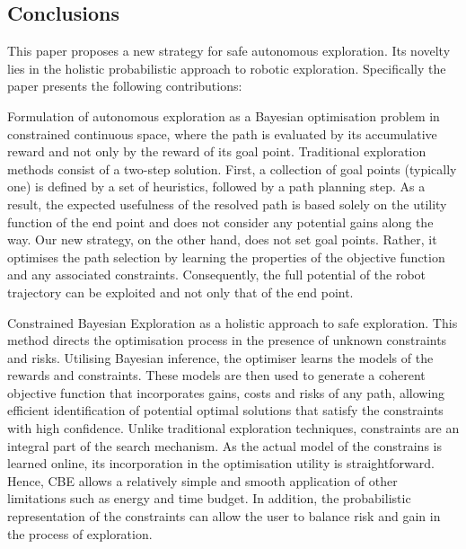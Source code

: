 \documentclass[shortAfour,sageh,times]{sagej_no_sage}
\begin{document}
\subsection{Conclusions}
\label{subsec:conclusion}
This paper proposes a new strategy for safe autonomous exploration. Its novelty lies in the holistic probabilistic approach to robotic exploration. Specifically the paper presents the following contributions:
\begin{inparaenum}[(i)]  
 	
 	\item Formulation of autonomous exploration as a Bayesian optimisation problem in constrained continuous space, where the path is evaluated by its accumulative reward and not only by the reward of its goal point. Traditional exploration methods consist of a two-step solution. First, a collection of goal points (typically one) is defined by a set of heuristics, followed by a path planning step. As a result, the expected usefulness of the resolved path is based solely on the utility function of the end point and does not consider any potential gains along the way. Our new strategy, on the other hand, does not set goal points. Rather, it optimises the path selection by learning the properties of the objective function and any associated constraints. Consequently, the full potential of the robot trajectory can be exploited and not only that of the end point. 
 	
 	\item Constrained Bayesian Exploration as a holistic approach to safe exploration. This method directs the optimisation process in the presence of unknown constraints and risks. Utilising Bayesian inference, the optimiser learns the models of the rewards and constraints. These models are then used to generate a coherent objective function that incorporates gains, costs and risks of any path, allowing efficient identification of potential optimal solutions that satisfy the constraints with high confidence. Unlike traditional exploration techniques, constraints are an integral part of the search mechanism. As the actual model of the constrains is learned online, its incorporation in the optimisation utility is straightforward. Hence, CBE allows a relatively simple and smooth application of other limitations such as energy and time budget. In addition, the probabilistic representation of the constraints can allow the user to balance risk and gain in the process of exploration. 
 \end{inparaenum}
 
\end{document}
